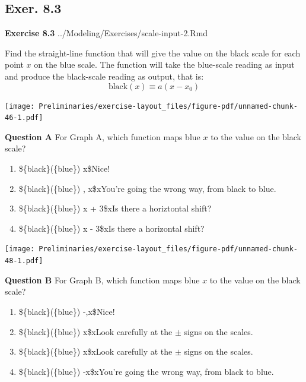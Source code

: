 \documentclass[
  letterpaper,
  DIV=11,
  numbers=noendperiod,
  oneside]{article}
\providecommand{\tightlist}{%
  \setlength{\itemsep}{0pt}\setlength{\parskip}{0pt}}\usepackage{longtable,booktabs,array}
\begin{document}
\begin{multicols}{2}
\hypertarget{exer.-8.3}{%
\section*{Exer. 8.3}\label{exer.-8.3}}

\textbf{Exercise 8.3} ../Modeling/Exercises/scale-input-2.Rmd

Find the straight-line function that will give the value on the black
scale for each point \(x\) on the blue scale. The function will take the
blue-scale reading as input and produce the black-scale reading as
output, that is: \[\text{black}(x) \equiv a (x - x_0)\]

\texttt{[image: Preliminaries/exercise-layout\_files/figure-pdf/unnamed-chunk-46-1.pdf]}

\textbf{Question A} For Graph A, which function maps blue \(x\) to the
value on the black scale?

\begin{enumerate}
\def\labelenumi{\roman{enumi}.}
\tightlist
\item
  {\$\text\{black\}(\text\{blue\}) \equiv {} x\${Nice!~}}\\
\item
  {\$\text\{black\}(\text\{blue\}) , x\${xYou're going the wrong
  way, from black to blue.}}\\
\item
  {\$\text\{black\}(\text\{blue\}) \equiv x + 3\${xIs there a
  horiztontal shift?}}\\
\item
  {\$\text\{black\}(\text\{blue\}) \equiv x - 3\${xIs there a horizontal
  shift?}}
\end{enumerate}

\texttt{[image: Preliminaries/exercise-layout\_files/figure-pdf/unnamed-chunk-48-1.pdf]}

\textbf{Question B} For Graph B, which function maps blue \(x\) to the
value on the black scale?

\begin{enumerate}
\def\labelenumi{\roman{enumi}.}
\tightlist
\item
  {\$\text\{black\}(\text\{blue\}) \equiv -,x\${Nice!~}}\\
\item
  {\$\text\{black\}(\text\{blue\}) \equiv {} x\${xLook
  carefully at the \(\pm\) signs on the scales.}}\\
\item
  {\$\text\{black\}(\text\{blue\}) \equiv {} x\${xLook
  carefully at the \(\pm\) signs on the scales.}}\\
\item
  {\$\text\{black\}(\text\{blue\}) \equiv -x\${xYou're going
  the wrong way, from black to blue.}}
\end{enumerate}


\end{multicols}
\end{document}
